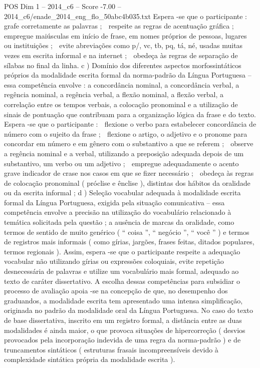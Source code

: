 \begin{textsample}{POS Dim 1 – 2014\_c6 – Score -7.00 – 2014\_c6/enade\_2014\_eng\_flo\_50abc4b035.txt}
Espera -se que o participante :  grafe corretamente as palavras ;  respeite as regras de acentuação gráfica ;  empregue maiúsculas em início de frase, em nomes próprios de pessoas, lugares ou instituições ;  evite abreviações como p/, vc, tb, pq, tá, né, usadas muitas vezes em escrita informal e na internet ;  obedeça às regras de separação de sílabas no final da linha. c ) Domínio dos diferentes aspectos morfossintáticos próprios da modalidade escrita formal da norma-padrão da Língua Portuguesa – essa competência envolve : a concordância nominal, a concordância verbal, a regência nominal, a regência verbal, a flexão nominal, a flexão verbal, a correlação entre os tempos verbais, a colocação pronominal e a utilização de sinais de pontuação que contribuam para a organização lógica da frase e do texto.
Espera -se que o participante :  flexione o verbo para estabelecer concordância de número com o sujeito da frase ;  flexione o artigo, o adjetivo e o pronome para concordar em número e em gênero com o substantivo a que se referem ;  observe a regência nominal e a verbal, utilizando a preposição adequada depois de um substantivo, um verbo ou um adjetivo ;  empregue adequadamente o acento grave indicador de crase nos casos em que se fizer necessário ;  obedeça às regras de colocação pronominal ( próclise e ênclise ), distintas dos hábitos da oralidade ou da escrita informal ; d ) Seleção vocabular adequada à modalidade escrita formal da Língua Portuguesa, exigida pela situação comunicativa – essa competência envolve a precisão na utilização do vocabulário relacionado à temática solicitada pela questão ; a ausência de marcas da oralidade, como termos de sentido de muito genérico ( “ coisa ”, “ negócio ”, “ você ” ) e termos de registros mais informais ( como gírias, jargões, frases feitas, ditados populares, termos regionais ).
Assim, espera -se que o participante respeite a adequação vocabular não utilizando gírias ou expressões coloquiais, evite repetição desnecessária de palavras e utilize um vocabulário mais formal, adequado ao texto de caráter dissertativo.
A escolha dessas competências para subsidiar o processo de avaliação apoia -se na concepção de que, no desempenho dos graduandos, a modalidade escrita tem apresentado uma intensa simplificação, originada no padrão da modalidade oral da Língua Portuguesa.
No caso do texto de base dissertativa, inscrito em um registro formal, a distância entre as duas modalidades é ainda maior, o que provoca situações de hipercorreção ( desvios provocados pela incorporação indevida de uma regra da norma-padrão ) e de truncamentos sintáticos ( estruturas frasais incompreensíveis devido à complexidade sintática própria da modalidade escrita ).

\end{textsample}
